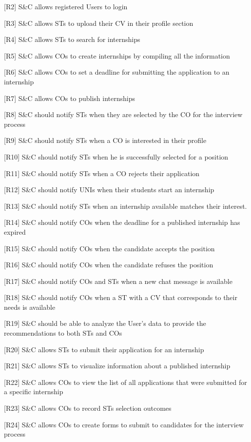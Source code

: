 [R2] S\&C allows registered Users to login	

[R3] S\&C allows STs to upload their CV in their profile section

[R4] S\&C allows STs to search for internships

[R5] S\&C allows COs to create internships by compiling all the information

[R6] S\&C allows COs to set a deadline for submitting the application to an internship

[R7] S\&C allows COs to publish internships

[R8] S\&C should notify STs when they are selected by the CO for the interview process

[R9] S\&C should notify STs when a CO is interested in their profile

[R10] S\&C should notify STs when he is successfully selected for a position

[R11] S\&C should notify STs when a CO rejects their application

[R12] S\&C should notify UNIs when their students start an internship

[R13] S\&C should notify STs when an internship available matches their interest.

[R14] S\&C should notify COs when the deadline for a published internship has expired

[R15] S\&C should notify COs when the candidate accepts the position

[R16] S\&C should notify COs when the candidate refuses the position

[R17] S\&C should notify COs and STs when a new chat message is available

[R18] S\&C should notify COs when a ST with a CV that corresponds to their needs is available

[R19] S\&C should be able to analyze the User’s data to provide the recommendations to both STs and COs

[R20] S\&C allows STs to submit their application for an internship	

[R21] S\&C allows STs to visualize information about a published internship

[R22] S\&C allows COs to view the list of all applications that were submitted for a specific internship

[R23] S\&C allows COs to record STs selection outcomes

[R24] S\&C allows COs to create forms to submit to candidates for the interview process

